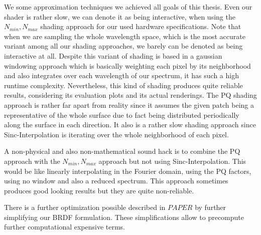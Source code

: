 We some approximation techniques we achieved all goals of this thesis. Even our shader is rather slow, we can denote it as being interactive, when using the $N_{min}, N_{max}$ shading approach for our used hardware specifications. Note that when we are sampling the whole wavelength space, which is the most accurate variant among all our shading approaches, we barely can be denoted as being interactive at all. Despite this variant of shading is based in a gaussian windowing approach which is basically weighting each pixel by its neighborhood and also integrates over each wavelength of our spectrum, it has such a high runtime complexity. Nevertheless, this kind of shading produces quite reliable results, considering its evaluation plots and its actual renderings. The PQ shading approach is rather far apart from reality since it assumes the given patch being a representative of the whole surface due to fact being distributed periodically along the surface in each direction. It also is a rather slow shading approach since Sinc-Interpolation is iterating over the whole neighborhood of each pixel. 

A non-physical and also non-mathematical sound hack is to combine the PQ approach with the $N_{min}, N_{max}$ approach but not using Sinc-Interpolation. This would be like linearly interpolating in the Fourier domain, using the PQ factors, using no window and also a reduced spectrum. This approach sometimes produces good looking results but they are quite non-reliable. 

There is a further optimization possible described in $PAPER$ by further simplifying our BRDF formulation. These simplifications allow to precompute further computational expensive terms.  

